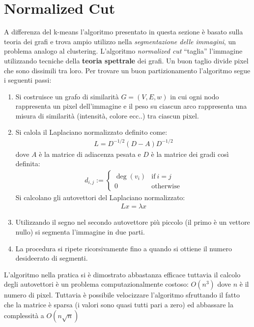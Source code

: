 \section{Normalized Cut} %
\label{sec:normalized_cut}
A differenza del k-means l'algoritmo presentato in questa sezione è basato sulla teoria dei grafi e trova ampio utilizzo nella \emph{segmentazione delle immagini}, un problema analogo al clustering.
L'algoritmo \emph{normalized cut} “taglia” l'immagine utilizzando tecniche della \textbf{teoria spettrale} dei grafi. Un buon taglio divide pixel che sono dissimili tra loro. Per trovare un buon partizionamento l'algoritmo segue i seguenti passi:
\begin{enumerate}
	\item Si costruisce un grafo di similarità $G=(V, E, w)$ in cui ogni nodo rappresenta un pixel dell'immagine e il peso su ciascun arco rappresenta una misura di similarità (intensità, colore ecc..) tra ciascun pixel.
	\item Si calola il Laplaciano normalizzato definito come:
	\begin{align}
		L = D ^ {- 1 / 2} (D - A) D ^ {- 1 / 2}
	\end{align}
	dove $A$ è la matrice di adiacenza pesata e $D$ è la matrice dei gradi così definita:
	\begin{align}
		d_{i,j}:=
		\begin{cases} 
			\deg(v_i) & \mbox{if}\ i = j \\
			0 & \mbox{otherwise}
		\end{cases}
	\end{align}
	Si calcolano gli autovettori del Laplaciano normalizzato:
	\begin{align}
		L x = \lambda x
	\end{align}
	
	\item Utilizzando il segno nel secondo autovettore più piccolo (il primo è un vettore nullo) si segmenta l'immagine in due parti.

	\item La procedura si ripete ricorsivamente fino a quando si ottiene il numero desideerato di segmenti.
\end{enumerate}

L'algoritmo nella pratica si è dimostrato abbastanza efficace tuttavia il calcolo degli autovettori è un problema computazionalmente costoso: $O(n^3)$ dove $n$ è il numero di pixel. Tuttavia è possibile velocizzare l'algoritmo sfruttando il fatto che la matrice è sparsa (i valori sono quasi tutti pari a zero) ed abbassare la complessità a $O(n \sqrt{n})$\\

